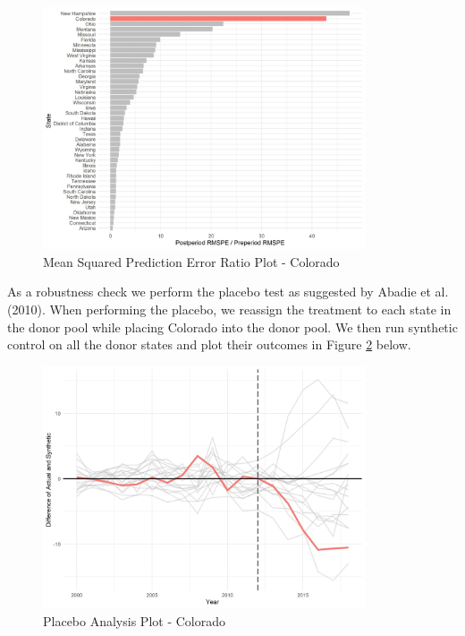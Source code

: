 \documentclass{article}
\begin{document}
\begin{figure}[H]
	\begin{center}
		\includegraphics[width=0.85\textwidth]{mspe_plot_colorado}
	\end{center}
	\caption{Mean Squared Prediction Error Ratio Plot - Colorado}
	\label{fig:mspe_plot_colorado}
\end{figure}

As a robustness check we perform the placebo test as suggested by Abadie et al. (2010). When performing the placebo, we reassign the treatment to each state in the donor pool while placing Colorado into the donor pool. We then run synthetic control on all the donor states and plot their outcomes in Figure \ref{fig:placebos_plot_colorado} below.

\begin{figure}[H]
	\begin{center}
		\includegraphics[width=0.85\textwidth]{placebos_plot_colorado}
	\end{center}
	\caption{Placebo Analysis Plot - Colorado}
	\label{fig:placebos_plot_colorado}
\end{figure}
\end{document}
